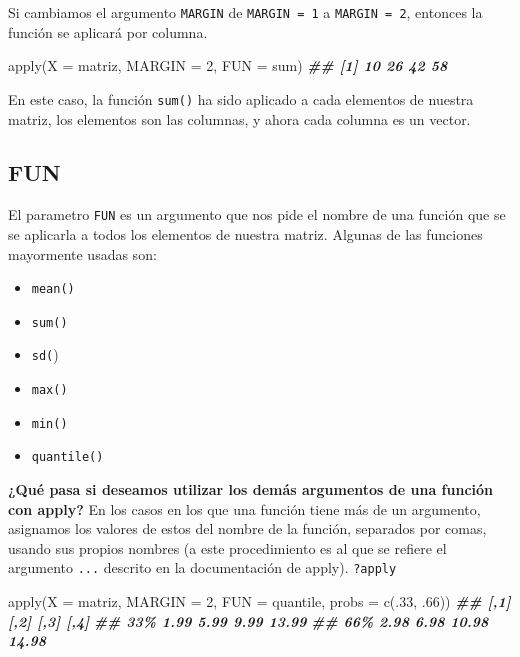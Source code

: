 \documentclass[
]{book}
\newenvironment{Shaded}{\begin{snugshade}}{\end{snugshade}}
\newcommand{\AttributeTok}[1]{\textcolor[rgb]{0.77,0.63,0.00}{#1}}
\newcommand{\DecValTok}[1]{\textcolor[rgb]{0.00,0.00,0.81}{#1}}
\newcommand{\DocumentationTok}[1]{\textcolor[rgb]{0.56,0.35,0.01}{\textbf{\textit{#1}}}}
\newcommand{\FunctionTok}[1]{\textcolor[rgb]{0.00,0.00,0.00}{#1}}
\newcommand{\NormalTok}[1]{#1}
\providecommand{\tightlist}{%
  \setlength{\itemsep}{0pt}\setlength{\parskip}{0pt}}
\begin{document}
Si cambiamos el argumento \texttt{MARGIN} de \texttt{MARGIN\ =\ 1} a \texttt{MARGIN\ =\ 2}, entonces la función se aplicará por columna.

\begin{Shaded}
\begin{Highlighting}[]
\FunctionTok{apply}\NormalTok{(}\AttributeTok{X =}\NormalTok{ matriz, }\AttributeTok{MARGIN =} \DecValTok{2}\NormalTok{, }\AttributeTok{FUN =}\NormalTok{ sum)}
\DocumentationTok{\#\# [1] 10 26 42 58}
\end{Highlighting}
\end{Shaded}

En este caso, la función \texttt{sum()} ha sido aplicado a cada elementos de nuestra matriz, los elementos son las columnas, y ahora cada columna es un vector.

\hypertarget{fun}{%
\subsection{FUN}\label{fun}}

El parametro \texttt{FUN} es un argumento que nos pide el nombre de una función que se se aplicarla a todos los elementos de nuestra matriz. Algunas de las funciones mayormente usadas son:

\begin{itemize}
\tightlist
\item
  \texttt{mean()}
\item
  \texttt{sum()}
\item
  \texttt{sd(})
\item
  \texttt{max()}
\item
  \texttt{min()}
\item
  \texttt{quantile()}
\end{itemize}

\textbf{¿Qué pasa si deseamos utilizar los demás argumentos de una función con apply?} En los casos en los que una función tiene más de un argumento, asignamos los valores de estos del nombre de la función, separados por comas, usando sus propios nombres (a este procedimiento es al que se refiere el argumento \texttt{...} descrito en la documentación de apply). \texttt{?apply}

\begin{Shaded}
\begin{Highlighting}[]
\FunctionTok{apply}\NormalTok{(}\AttributeTok{X =}\NormalTok{ matriz, }\AttributeTok{MARGIN =} \DecValTok{2}\NormalTok{, }\AttributeTok{FUN =}\NormalTok{ quantile, }\AttributeTok{probs =} \FunctionTok{c}\NormalTok{(.}\DecValTok{33}\NormalTok{, .}\DecValTok{66}\NormalTok{))}
\DocumentationTok{\#\#     [,1] [,2]  [,3]  [,4]}
\DocumentationTok{\#\# 33\% 1.99 5.99  9.99 13.99}
\DocumentationTok{\#\# 66\% 2.98 6.98 10.98 14.98}
\end{Highlighting}
\end{Shaded}
\end{document}
